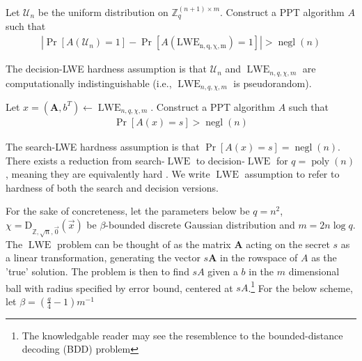 \begin{definition}
    Let $\mathcal{U}_n$ be the uniform distribution on $\mathbb{Z}_q^{(n+1) \times m}$. Construct a PPT algorithm $A$ such that 
    \begin{equation*}
        \begin{aligned}
        |\operatorname{Pr}[A(\mathcal{U}_n) = 1] - \operatorname{Pr}[A(\operatorname{LWE_{n,q,\chi,m}}) = 1]| > \operatorname{negl}(n)
        \end{aligned}
    \end{equation*}
\end{definition}
The decision-LWE hardness assumption is that $\mathcal{U}_n$ and $\operatorname{LWE}_{n,q,\chi,m}$ are computationally indistinguishable (i.e., $\operatorname{LWE}_{n,q,\chi,m}$ is pseudorandom).
\begin{definition}
    Let $x = (\textbf{A}, b^T) \leftarrow \operatorname{LWE}_{n,q,\chi,m}$. Construct a PPT algorithm $A$ such that 
    \begin{equation*}
        \begin{aligned}
            \operatorname{Pr}[A(x) = s] > \operatorname{negl}(n)
        \end{aligned}
    \end{equation*}
\end{definition}
The search-LWE hardness assumption is that $\operatorname{Pr}[A(x) = s] = \operatorname{negl}(n)$.
There exists a reduction from search-$\operatorname{LWE}$ to decision-$\operatorname{LWE}$ for $q = \operatorname{poly}(n)$, meaning they are equivalently hard \cite{LWE-hardness}. We write $\operatorname{LWE}$ assumption to refer to hardness of both the search and decision versions. 

For the sake of concreteness, let the parameters below be $q = n^2$, $\chi = \textrm{D}_{\mathbb{Z}, \sqrt{n}, \vec{0}}(\vec{x})$ be $\beta$-bounded discrete Gaussian distribution and $m = 2n \log q$. The $\operatorname{LWE}$ problem can be thought of as the matrix $\textbf{A}$ acting on the secret $s$ as a linear transformation, generating the vector $s\textbf{A}$ in the rowspace of $A$ as the 'true' solution. The problem is then to find $sA$ given a $b$ in the $m$ dimensional ball with radius specified by error bound, centered at $sA$.\footnote{The knowledgable reader may see the resemblence to the bounded-distance decoding (BDD) problem} For the below scheme, let $\beta = (\frac{q}{4} - 1)m^{-1}$

